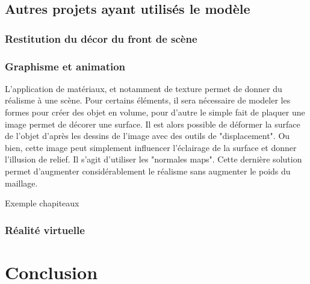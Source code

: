 \section{Autres projets ayant utilisés le modèle}
\label{sect-autres}


\subsection{Restitution du décor du front de scène}

\subsection{Graphisme et animation}
L'application de matériaux, et notamment de texture permet de donner du réalisme à une scène. Pour certains éléments, il sera nécessaire de modeler les formes pour créer des objet en volume, pour d'autre le simple fait de plaquer une image permet de décorer une surface. Il est alors possible de déformer la surface de l'objet d'après les dessins de l'image avec des outils de "displacement". Ou bien, cette image peut simplement influencer l'éclairage de la surface et donner l'illusion de relief. Il s'agit d'utiliser les "normales maps". Cette dernière solution permet d'augmenter considérablement le réalisme sans augmenter le poids du maillage.

Exemple chapiteaux

\subsection{Réalité virtuelle}
		
		
\chapter*{Conclusion}

